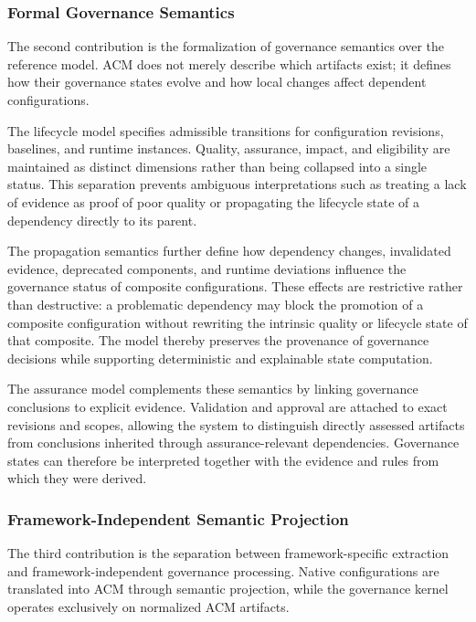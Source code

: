\documentclass[10pt]{article}
\begin{document}
\subsubsection{Formal Governance Semantics}

The second contribution is the formalization of governance semantics over the reference model. ACM does not merely describe which artifacts exist; it defines how their governance states evolve and how local changes affect dependent configurations.

The lifecycle model specifies admissible transitions for configuration revisions, baselines, and runtime instances. Quality, assurance, impact, and eligibility are maintained as distinct dimensions rather than being collapsed into a single status. This separation prevents ambiguous interpretations such as treating a lack of evidence as proof of poor quality or propagating the lifecycle state of a dependency directly to its parent.

The propagation semantics further define how dependency changes, invalidated evidence, deprecated components, and runtime deviations influence the governance status of composite configurations. These effects are restrictive rather than destructive: a problematic dependency may block the promotion of a composite configuration without rewriting the intrinsic quality or lifecycle state of that composite. The model thereby preserves the provenance of governance decisions while supporting deterministic and explainable state computation.

The assurance model complements these semantics by linking governance conclusions to explicit evidence. Validation and approval are attached to exact revisions and scopes, allowing the system to distinguish directly assessed artifacts from conclusions inherited through assurance-relevant dependencies. Governance states can therefore be interpreted together with the evidence and rules from which they were derived.

\subsubsection{Framework-Independent Semantic Projection}

The third contribution is the separation between framework-specific extraction and framework-independent governance processing. Native configurations are translated into ACM through semantic projection, while the governance kernel operates exclusively on normalized ACM artifacts.
\end{document}
